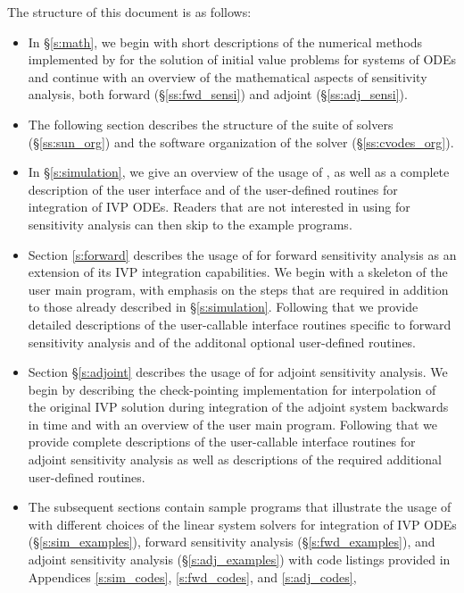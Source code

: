 The structure of this document is as follows:
\begin{itemize}
\item
  In \S\ref{s:math}, we begin with short descriptions of the numerical 
  methods implemented by {\cvodes} for the solution of initial value problems
  for systems of ODEs and continue with an overview of the mathematical aspects 
  of sensitivity analysis, both forward (\S\ref{ss:fwd_sensi}) and adjoint
  (\S\ref{ss:adj_sensi}).
\item
  The following section describes the structure of the {\sundials} suite
  of solvers (\S\ref{ss:sun_org}) and the software organization of the {\cvodes}
  solver (\S\ref{ss:cvodes_org}). 
\item
  In \S\ref{s:simulation}, we give an overview of the usage of {\cvodes},
  as well as a complete description of the user interface and of the 
  user-defined routines for integration of IVP ODEs. Readers that are not 
  interested in using {\cvodes} for sensitivity analysis can then 
  skip to the example programs.
\item
  Section \ref{s:forward} describes the usage of {\cvodes} for forward
  sensitivity analysis as an extension of its IVP integration capabilities. 
  We begin with a skeleton of the user main program, with emphasis on the 
  steps that are required in addition to those already described in \S\ref{s:simulation}.
  Following that we provide detailed descriptions of the user-callable interface routines 
  specific to forward sensitivity analysis and of the additonal optional user-defined
  routines.
\item
  Section \S\ref{s:adjoint} describes the usage of {\cvodes} for adjoint
  sensitivity analysis. We begin by describing the {\cvodes} check-pointing 
  implementation for interpolation of the original IVP solution during
  integration of the adjoint system backwards in time and with 
  an overview of the user main program. Following that we provide complete
  descriptions of the user-callable interface routines for adjoint sensitivity
  analysis as well as descriptions of the required additional user-defined routines.
\item
  The subsequent sections contain sample programs that illustrate
  the usage of {\cvodes} with different choices of the linear system
  solvers for integration of IVP ODEs (\S\ref{s:sim_examples}),
  forward sensitivity analysis (\S\ref{s:fwd_examples}), and adjoint
  sensitivity analysis (\S\ref{s:adj_examples}) with code listings provided
  in Appendices \ref{s:sim_codes}, \ref{s:fwd_codes}, and \ref{s:adj_codes},

\end{itemize}
